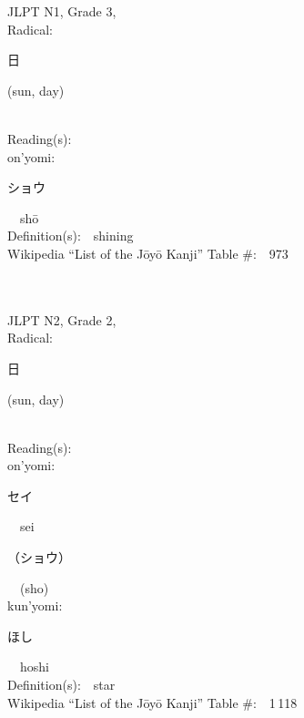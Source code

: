 \begin{multicols}{2}
{JLPT N1, Grade 3, \\Radical:\ \ {\begin{CJK}{UTF8}{min} 日 \end{CJK}} (sun, day) } \\
Reading(s):\ \ \\
{\hspace*{1em}}on'yomi:\ \ \\
{\hspace*{2em}}{\begin{CJK}{UTF8}{min} ショウ \end{CJK}}\ \ sh\=o\ \ \\
Definition(s):\ \ shining \\
Wikipedia ``List of the J\=oy\=o Kanji'' Table \#:\ \ 973 \\
\ \ \\
{\fontsize{34pt}{40pt}  }\ \ \\  %
{JLPT N2, Grade 2, \\Radical:\ \ {\begin{CJK}{UTF8}{min} 日 \end{CJK}} (sun, day) } \\
Reading(s):\ \ \\
{\hspace*{1em}}on'yomi:\ \ \\
{\hspace*{2em}}{\begin{CJK}{UTF8}{min} セイ \end{CJK}}\ \ sei\ \ \\
{\hspace*{2em}}{\begin{CJK}{UTF8}{min} （ショウ） \end{CJK}}\ \ (sho)\ \ \\
{\hspace*{1em}}kun'yomi:\ \ \\
{\hspace*{2em}}{\begin{CJK}{UTF8}{min} ほし \end{CJK}}\ \ hoshi\ \ \\
Definition(s):\ \ star \\
Wikipedia ``List of the J\=oy\=o Kanji'' Table \#:\ \ 1\,118 \\
\ \ \\
{\fontsize{34pt}{40pt}  }\ \ \\  %

\end{multicols}
